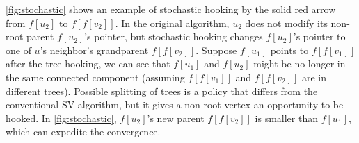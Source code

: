 \documentclass{sokendai_thesis} %
\begin{document}
\autoref{fig:stochastic} shows an example of stochastic hooking by the solid red arrow from $f[u_2]$ to $f[f[v_2]]$.
In the original algorithm, $u_2$ does not modify its non-root parent $f[u_2]$'s pointer, but stochastic hooking changes $f[u_2]$'s pointer to one of $u$'s neighbor's grandparent $f[f[v_2]]$.
Suppose $f[u_1]$ points to $f[f[v_1]]$ after the tree hooking, we can see that $f[u_1]$ and $f[u_2]$ might be no longer in the same connected component (assuming $f[f[v_1]]$ and $f[f[v_2]]$ are in different trees).
Possible splitting of trees is a policy that differs from the conventional SV algorithm, but it gives a non-root vertex an opportunity to be hooked.
In \autoref{fig:stochastic}, $f[u_2]$'s new parent $f[f[v_2]]$ is smaller than $f[u_1]$, which can expedite the convergence.

\end{document}
